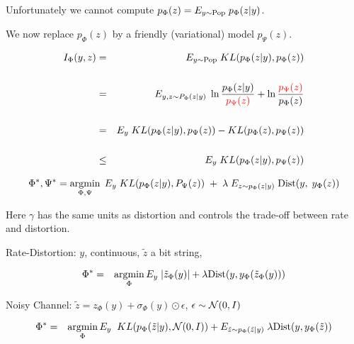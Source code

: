 {

Unfortunately we cannot compute {\color{red} $p_\Phi(z) = E_{y \sim \mathrm{Pop}}\;p_\Phi(z|y)$}.

\vfill
We now replace {\color{red} $p_\Phi(z)$} by a friendly (variational) model {\color{red} $p_\Psi(z)$}.

\begin{eqnarray*}
I_\Phi(y,z) & = & E_{y \sim \mathrm{Pop}}\; KL(p_\Phi(z|y),p_\Phi(z)) \\
\\
& = & E_{y,z\sim P_\Phi(z|y)}\; \ln \frac{p_\Phi(z|y)}{{\color{red} p_\Psi(z)}} + \ln \frac{{\color{red} p_\Psi(z)}}{p_\Phi(z)} \\
\\
& = & E_y\;KL(p_\Phi(z|y),p_\Psi(z)) - KL(p_\Phi(z),p_\Psi(z)) \\
\\
& \leq & E_y\;KL(p_\Phi(z|y),p_\Psi(z))
\end{eqnarray*}


{\huge {\color{red} $$\Phi^*,\Psi^* = \operatorname*{argmin}_{\Phi,\Psi}\;E_y \;KL(p_\Phi(z|y),P_\Psi(z)) \;+\; \lambda \; E_{z\sim p_\Phi(z|y)}\;\mathrm{Dist}(y,\;y_\Phi(z))$$}}

\vfill
Here $\gamma$ has the same units as distortion and controls the trade-off between rate and distortion.



Rate-Distortion: $y$, continuous, $\tilde{z}$ a bit string,

{\color{red}
\begin{eqnarray*}
\Phi^* &  = &  \operatorname*{argmin}_\Phi E_y \;|\tilde{z}_\Phi(y)| + \lambda \mathrm{Dist}(y,y_\Phi(\tilde{z}_\Phi(y)))
\end{eqnarray*}
}

\vfill
Noisy Channel: {\color{red} $\tilde{z} = z_\Phi(y) + \sigma_\Phi(y) \odot \epsilon$,\hspace{2em} $\epsilon \sim {\cal N}(0,I)$}

{\color{red}
\begin{eqnarray*}
\Phi^* & = & \operatorname*{argmin}_\Phi E_y\; \;KL(p_\Phi(\tilde{z}|y),{\cal N}(0,I)) + E_{\tilde{z}\sim p_\Phi(\tilde{z}|y)}\;\lambda \mathrm{Dist}(y,y_\Phi(\tilde{z}))
\end{eqnarray*}
}


}


